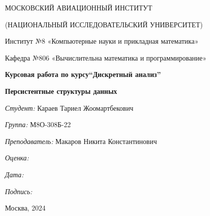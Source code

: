 \documentclass[12pt]{article}
\begin{document}
\thispagestyle{empty}
\begin{center}
	МОСКОВСКИЙ АВИАЦИОННЫЙ ИНСТИТУТ

	(НАЦИОНАЛЬНЫЙ ИССЛЕДОВАТЕЛЬСКИЙ УНИВЕРСИТЕТ)
\vspace{3ex}

	Институт №8 «Компьютерные науки и прикладная математика»

	Кафедра №806 «Вычислительна математика и программирование»

\end{center}
\vspace{25ex}
\begin{center}
	\textbf{\large{Курсовая работа по курсу\linebreak \textquotedblleft Дискретный анализ\textquotedblright}}
\end{center}
\vspace{3ex}
\begin{center}
    \textbf{\large{Персистентные структуры данных}}
\end{center}
\vspace{20ex}
\begin{flushright}
	\textit{Студент: } Караев Тариел Жоомартбекович

	\vspace{2ex}
	\textit{Группа: } М8О-308Б-22

	\vspace{2ex}
	\textit{Преподаватель: } Макаров Никита Константинович

	\vspace{2ex}
	\textit{Оценка: } \underline{\quad\quad\quad\quad\quad\quad}

	 \vspace{2ex}
	\textit{Дата: } \underline{\quad\quad\quad\quad\quad\quad}

	\vspace{2ex}
	\textit{Подпись: } \underline{\quad\quad\quad\quad\quad\quad}

\end{flushright}
\vspace{5ex}

\begin{vfill}
	\begin{center}
		Москва, 2024
	\end{center}
\end{vfill}
\newpage
\end{document}
